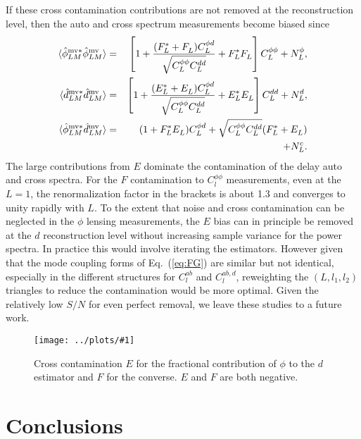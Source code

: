 \documentclass[prd,amsmath,amssymb,floatfix,superscriptaddress,nofootinbib,twocolumn]{revtex4-1}
\def\bea{\begin{eqnarray}}
\def\eea{\end{eqnarray}}
\newcommand{\ec}[1]{Eq.~(\ref{eq:#1})}
\newcommand{\sfig}[2]{
\texttt{[image: ../plots/\#1]}
        }
\newcommand{\Sfig}[2]{
   \begin{figure}[thbp]
   \begin{center}
    \sfig{#1.pdf}{\columnwidth}
    \caption{{\small #2}}
    \label{fig:#1}
     \end{center}
   \end{figure}
}
\begin{document}
 If these cross contamination contributions are not removed at the reconstruction level, then
 the auto and cross spectrum measurements become biased since
 \bea
  \langle \hat{\phi}^{\rm mv*}_{LM}\hat{\phi}^{\rm mv}_{LM} \rangle &=&
  \left[ 1 +\frac{(F_L^{*}+F_L^{} )C_L^{\phi d}}{\sqrt{C_L^{\phi\phi} C_L^{dd} }}
  + F_L^{*}F_L^{} \right] C_L^{\phi\phi} 
  + N_L^{\phi}, \nonumber\\
    \langle \hat{d}^{\rm mv*}_{LM}\hat{d}^{\rm mv}_{LM} \rangle &=&
  \left[ 1 +\frac{(E_L^{*}+E_L^{} )C_L^{\phi d}}{\sqrt{C_L^{\phi\phi} C_L^{dd} }}
  + E_L^{*}E_L^{} \right] C_L^{dd} 
  + N_L^{d}, \nonumber\\
 \langle \hat{\phi}^{\rm mv*}_{LM}\hat{d}^{\rm mv}_{LM} \rangle&=& (1+ F_L^{*} E_L^{}){C}_{L}^{\phi d}+ \sqrt{C_{L}^{\phi\phi} C_{L}^{dd}} ( F_L^{*} + E_L^{}) \nonumber\\
&&  +N_{L}^{c} .
\eea
The large contributions from $E$ dominate the contamination of the delay auto and cross spectra. For the $F$ contamination to $C_l^{\phi\phi}$ measurements, even at the $L=1$, the renormalization factor in the brackets is about 1.3 and converges to unity rapidly with $L$. To the extent that noise and cross contamination can be neglected in the $\phi$ lensing measurements, the $E$ bias can in principle be removed at the $d$ reconstruction level without increasing sample variance for the power spectra.    In practice this would involve iterating
the estimators.   
However given that the mode 
coupling forms  of \ec{FG} are similar but not identical, especially in the different structures for $C_l^{ab}$ and $C_l^{ab,d}$, reweighting the $(L,l_1,l_2)$ triangles
to reduce the contamination would be more optimal.  Given the relatively low $S/N$ for 
even perfect removal, we leave these studies to a future work.




\Sfig{Cont_multi}{Cross contamination $E$ for the fractional contribution of $\phi$ to the $d$ estimator and $F$ for the converse. $E$ and $F$ are both negative.}


\section{Conclusions}
\end{document}
